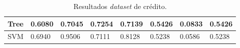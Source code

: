 \begin{table}[h]
\begin{tabular}{|l|l|l|l|l|l|l|l|}
		Tree                                                       & \cellcolor[HTML]{CB0000}0.6080 & \cellcolor[HTML]{CB0000}0.7045 & 0.7254                         & \cellcolor[HTML]{CB0000}0.7139 & 0.5426                         & 0.0833                         & 0.5426                         \\ \hline
		SVM                                                        & 0.6940                         & \cellcolor[HTML]{32CB00}0.9506 & \cellcolor[HTML]{CB0000}0.7111 & 0.8128                         & \cellcolor[HTML]{CB0000}0.5238 & \cellcolor[HTML]{CB0000}0.0586 & \cellcolor[HTML]{CB0000}0.5238 \\ \hline
	\end{tabular}
	\caption{Resultados \textit{dataset} de crédito.}
	\label{resul_cred}
\end{table}

